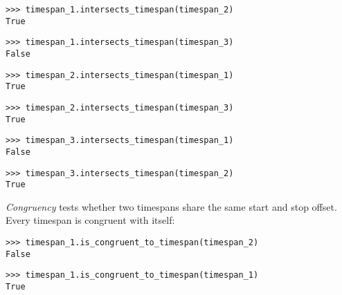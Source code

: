 \begin{comment}
<abjad>
timespan_1.intersects_timespan(timespan_2)
timespan_1.intersects_timespan(timespan_3)
timespan_2.intersects_timespan(timespan_1)
timespan_2.intersects_timespan(timespan_3)
timespan_3.intersects_timespan(timespan_1)
timespan_3.intersects_timespan(timespan_2)
</abjad>
\end{comment}

\begin{abjadbookoutput}
\begin{singlespacing}
\vspace{-0.5\baselineskip}
\begin{verbatim}
>>> timespan_1.intersects_timespan(timespan_2)
True
\end{verbatim}
\begin{verbatim}
>>> timespan_1.intersects_timespan(timespan_3)
False
\end{verbatim}
\begin{verbatim}
>>> timespan_2.intersects_timespan(timespan_1)
True
\end{verbatim}
\begin{verbatim}
>>> timespan_2.intersects_timespan(timespan_3)
True
\end{verbatim}
\begin{verbatim}
>>> timespan_3.intersects_timespan(timespan_1)
False
\end{verbatim}
\begin{verbatim}
>>> timespan_3.intersects_timespan(timespan_2)
True
\end{verbatim}
\end{singlespacing}
\end{abjadbookoutput}

\noindent \emph{Congruency} tests whether two timespans share the same start
and stop offset. Every timespan is congruent with itself:

\begin{comment}
<abjad>
timespan_1.is_congruent_to_timespan(timespan_2)
timespan_1.is_congruent_to_timespan(timespan_1)
</abjad>
\end{comment}

\begin{abjadbookoutput}
\begin{singlespacing}
\vspace{-0.5\baselineskip}
\begin{verbatim}
>>> timespan_1.is_congruent_to_timespan(timespan_2)
False
\end{verbatim}
\begin{verbatim}
>>> timespan_1.is_congruent_to_timespan(timespan_1)
True
\end{verbatim}
\end{singlespacing}
\end{abjadbookoutput}

